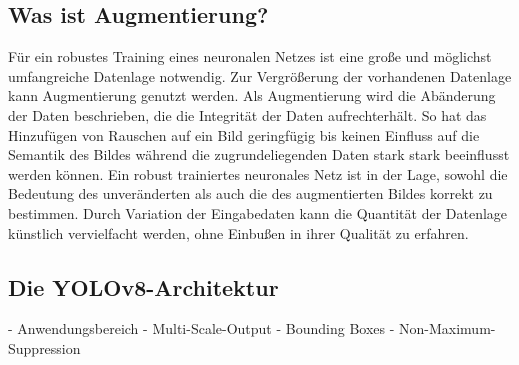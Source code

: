 

\subsection{Was ist Augmentierung?}
\label{sec:was_augmentierung}

Für ein robustes Training eines neuronalen Netzes ist eine große und möglichst umfangreiche Datenlage notwendig. Zur Vergrößerung der vorhandenen Datenlage kann Augmentierung genutzt werden. Als Augmentierung wird die Abänderung der Daten beschrieben, die die Integrität der Daten aufrechterhält. So hat das Hinzufügen von Rauschen auf ein Bild geringfügig bis keinen Einfluss auf die Semantik des Bildes während die zugrundeliegenden Daten stark stark beeinflusst werden können. Ein robust trainiertes neuronales Netz ist in der Lage, sowohl die Bedeutung des unveränderten als auch die des augmentierten Bildes korrekt zu bestimmen. Durch Variation der Eingabedaten kann die Quantität der Datenlage künstlich vervielfacht werden, ohne Einbußen in ihrer Qualität zu erfahren.



\subsection{Die YOLOv8-Architektur}
\label{sec:yolov8}

- Anwendungsbereich
- Multi-Scale-Output
- Bounding Boxes
- Non-Maximum-Suppression

\todo{}

